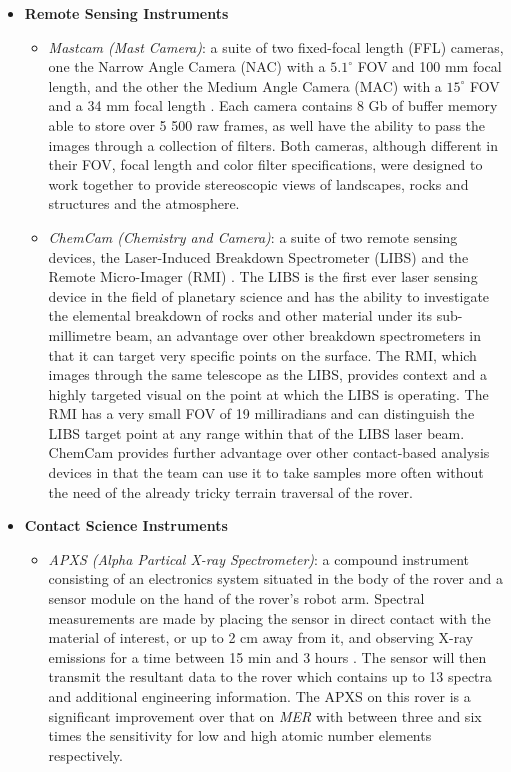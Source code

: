         \begin{itemize}
          \item \textbf{Remote Sensing Instruments}
          \begin{itemize}
            \item \textit{Mastcam (Mast Camera)}: a suite of two fixed-focal length (FFL) cameras, one the Narrow Angle Camera (NAC) with a $5.1^{\circ}$ FOV and 100 mm focal length, and the other the Medium Angle Camera (MAC) with a $15^{\circ}$ FOV and a 34 mm focal length \cite{mslsciencecornermastcam}. Each camera contains 8 Gb of buffer memory able to store over 5 500 raw frames, as well have the ability to pass the images through a collection of filters. Both cameras, although different in their FOV, focal length and color filter specifications, were designed to work together to provide stereoscopic views of landscapes, rocks and structures and the atmosphere.
            \item \textit{ChemCam (Chemistry and Camera)}: a suite of two remote sensing devices, the Laser-Induced Breakdown Spectrometer (LIBS) and the Remote Micro-Imager (RMI) \cite{mslsciencecornerchemcam}. The LIBS is the first ever laser sensing device in the field of planetary science and has the ability to investigate the elemental breakdown of rocks and other material under its sub-millimetre beam, an advantage over other breakdown spectrometers in that it can target very specific points on the surface. The RMI, which images through the same telescope as the LIBS, provides context and a highly targeted visual on the point at which the LIBS is operating. The RMI has a very small FOV of 19 milliradians and can distinguish the LIBS target point at any range within that of the LIBS laser beam. ChemCam provides further advantage over other contact-based analysis devices in that the team can use it to take samples more often without the need of the already tricky terrain traversal of the rover.
          \end{itemize}
          \item \textbf{Contact Science Instruments}
          \begin{itemize}
            \item \textit{APXS (Alpha Partical X-ray Spectrometer)}: a compound instrument consisting of an electronics system situated in the body of the rover and a sensor module on the hand of the rover's robot arm. Spectral measurements are made by placing the sensor in direct contact with the material of interest, or up to 2 cm away from it, and observing X-ray emissions for a time between 15 min and 3 hours \cite{mslsciencecornerapxs}. The sensor will then transmit the resultant data to the rover which contains up to 13 spectra and additional engineering information. The APXS on this rover is a significant improvement over that on \textit{MER} with between three and six times the sensitivity for low and high atomic number elements respectively.

\end{itemize}
\end{itemize}
